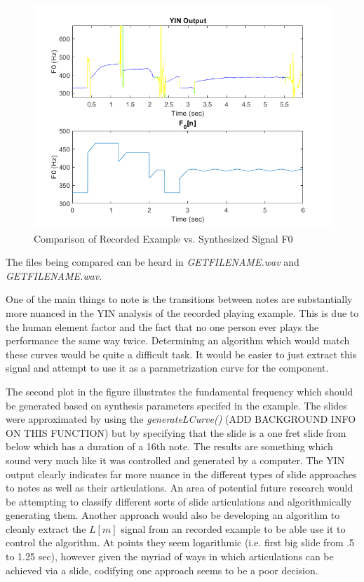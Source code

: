 \documentclass[../main.tex]{subfiles}
\begin{document}
\begin{figure}[h]
    \centering
    \includegraphics[scale=.65]{./images/plots/F0Compare.png}
    \caption{Comparison of Recorded Example vs. Synthesized Signal F0}
    \label{fig:YINOutput}
\end{figure}

The files being compared can be heard in \emph{GETFILENAME.wav} and \emph{GETFILENAME.wav}.

One of the main things to note is the transitions between notes are substantially more nuanced in the YIN analysis of the recorded playing example. This is due to the human element factor and the fact that no one person ever plays the performance the same way twice. Determining an algorithm which would match these curves would be quite a difficult task. It would be easier to just extract this signal and attempt to use it as a parametrization curve for the component.

The second plot in the figure illustrates the fundamental frequency which should be generated based on synthesis parameters specifed in the example. The slides were approximated by using the \emph{generateLCurve()} (ADD BACKGROUND INFO ON THIS FUNCTION) but by specifying that the slide is a one fret slide from below which has a duration of a 16th note. The results are something which sound very much like it was controlled and generated by a computer. The YIN output clearly indicates far more nuance in the different types of slide  approaches to notes as well as their articulations. An area of potential future research would be attempting to classify different sorts of slide articulations and algorithmically generating them. Another approach would also be developing an algorithm to cleanly extract the $L[m]$ signal from an recorded example to be able use it to control the algorithm. At points they seem logarithmic (i.e. first big slide from .5 to 1.25 sec), however given the myriad of ways in which articulations can be achieved via a slide, codifying one approach seems to be a poor decision.
\end{document}
